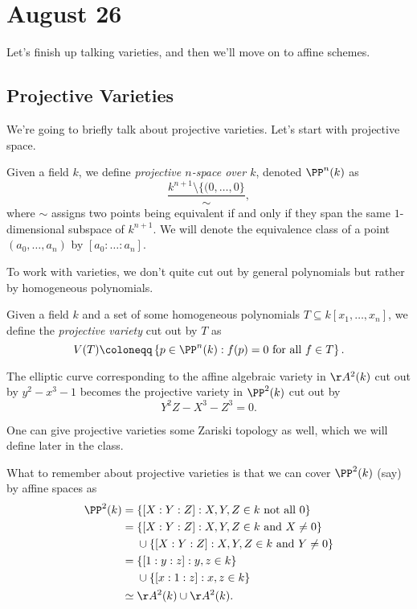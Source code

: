 \documentclass[../notes.tex]{subfiles}
\begin{document}
\section{August 26}

Let's finish up talking varieties, and then we'll move on to affine schemes.

\subsection{Projective Varieties}
We're going to briefly talk about projective varieties. Let's start with projective space.
\begin{definition}
	Given a field $k$, we define \textit{projective $n$-space over $k$}, denoted $\PP^n(k)$ as
	\[\frac{k^{n+1}\setminus\{(0,\ldots,0\}}{\sim},\]
	where $\sim$ assigns two points being equivalent if and only if they span the same $1$-dimensional subspace of $k^{n+1}$. We will denote the equivalence class of a point $(a_0,\ldots,a_n)$ by $[a_0:\ldots:a_n]$.
\end{definition}
To work with varieties, we don't quite cut out by general polynomials but rather by homogeneous polynomials.
\begin{definition}
	Given a field $k$ and a set of some homogeneous polynomials $T\subseteq k[x_1,\ldots,x_n]$, we define the \textit{projective variety} cut out by $T$ as
	\[V(T)\coloneqq\left\{p\in\PP^n(k):f(p)=0\text{ for all }f\in T\right\}.\]
\end{definition}
\begin{example} \label{ex:projec}
	The elliptic curve corresponding to the affine algebraic variety in $\AA^2(k)$ cut out by $y^2-x^3-1$ becomes the projective variety in $\PP^2(k)$ cut out by
	\[Y^2Z-X^3-Z^3=0.\]
\end{example}
\begin{remark}
	One can give projective varieties some Zariski topology as well, which we will define later in the class.
\end{remark}
What to remember about projective varieties is that we can cover $\PP^2(k)$ (say) by affine spaces as
\begin{align*}
	\PP^2(k) ={}& \{[X:Y:Z]:X,Y,Z\in k\text{ not all }0\} \\
	={}& \{[X:Y:Z]:X,Y,Z\in k\text{ and }X\ne0\} \\
	{}&\cup \{[X:Y:Z]:X,Y,Z\in k\text{ and }Y\ne0\} \\
	={}& \{[1:y:z]:y,z\in k\} \\
	{}&\cup \{[x:1:z]:x,z\in k\} \\
	\simeq{}&\AA^2(k)\cup\AA^2(k).
\end{align*}
\end{document}
